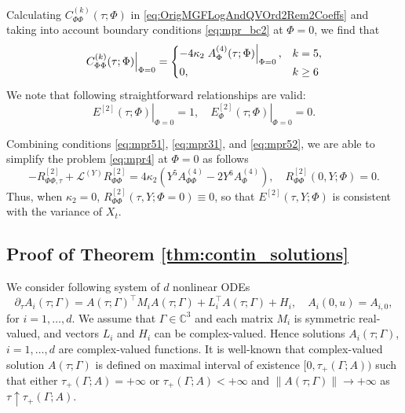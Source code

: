 \documentclass[pdftex,11pt,a4paper] {article}
\begin{document}
Calculating $C_{\Phi\Phi}^{(k)}(\tau;\Phi)$ in \eqref{eq:OrigMGFLogAndQVOrd2Rem2Coeffs} and taking into account boundary conditions \eqref{eq:mpr_bc2} at $\Phi=0$, we find that
\begin{equation}\label{eq:mpr51}
\left.C^{(k)}_{\Phi\Phi}(\tau; \Phi)\right|_{\Phi=0}=
\begin{cases}
-4\kappa_2 \left. A^{(4)}_{\Phi}(\tau; \Phi)\right|_{\Phi=0}, & k=5,\\
0, & k\ge 6\vspace*{-0.5\baselineskip}
\end{cases}
\end{equation}
We note that following straightforward relationships are valid:
\begin{equation}\label{eq:mpr52}
\left.E^{[2]}(\tau;\Phi)\right|_{\Phi=0}=1,\quad 
\left.E_{\Phi}^{[2]}(\tau;\Phi)\right|_{\Phi=0}=0.
\end{equation}

Combining conditions \eqref{eq:mpr51}, \eqref{eq:mpr31}, and \eqref{eq:mpr52}, we are able to simplify the problem \eqref{eq:mpr4} at $\Phi=0$ as follows
\begin{equation}\label{eq:mpr6}
-R_{\Phi\Phi,\tau}^{[2]}+\mathcal{L}^{(Y)}R_{\Phi\Phi}^{[2]}=4\kappa_2\left(Y^5 A_{\Phi\Phi}^{(4)}-2Y^6 A_{\Phi}^{(4)}\right),\quad 
R_{\Phi\Phi}^{[2]}(0,Y;\Phi)=0.
\end{equation}
Thus, when $\kappa_2=0$, $R_{\Phi\Phi}^{[2]}(\tau,Y;\Phi=0)\equiv 0$, so that $E^{[2]}(\tau,Y; \Phi)$ is consistent with the variance of $X_t$. 




\subsection{Proof of Theorem \ref{thm:contin_solutions}}\label{app:contin_solutions}  
We consider following system of $d$ nonlinear ODEs
\begin{equation}\label{eq:ODE_syst}
\partial_{\tau} A_i(\tau; \Gamma)=A(\tau; \Gamma)^\top M_iA(\tau; \Gamma)+L_i^\top A(\tau; \Gamma)+H_i,\quad A_i(0,u)=A_{i,0},
\end{equation}
for $i=1,\ldots,d$. We assume that $\Gamma\in \mathbb{C}^3$ and each matrix $M_i$ is symmetric real-valued, and vectors $L_i$ and $H_i$ can be complex-valued. Hence solutions $A_i(\tau; \Gamma)$, $i=1,\ldots, d$ are complex-valued functions. It is well-known that complex-valued solution $A(\tau; \Gamma)$ is defined on maximal interval of existence $[0,\tau_+(\Gamma; A))$ such that either $\tau_+(\Gamma; A)=+\infty$ or $\tau_+(\Gamma; A)<+\infty$ and $\|A(\tau; \Gamma)\|\to +\infty$ as $\tau\uparrow \tau_+(\Gamma; A)$. 
\end{document}
